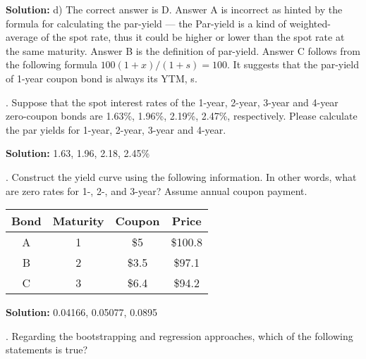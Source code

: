 \documentclass[11.5pt]{article}
\begin{document}
\noindent \textbf{Solution:} d) The correct answer is D. Answer A is incorrect as hinted by the formula for calculating the par-yield --- the Par-yield is a kind of weighted-average of the spot rate, thus it could be higher or lower than the spot rate at the same maturity. Answer B is the definition of par-yield. Answer C follows from the following formula $100(1+x)/(1+s)=100$. It suggests that the par-yield of 1-year coupon bond is always its YTM, s.


\vspace{30pt}



\newpage 



. Suppose that the spot interest rates of the 1-year, 2-year, 3-year and 4-year zero-coupon bonds are 1.63\%, 1.96\%, 2.19\%, 2.47\%, respectively. Please calculate the par yields for 1-year, 2-year, 3-year and 4-year.

\vskip1cm

\noindent \textbf{Solution:} 1.63, 1.96, 2.18, 2.45\%


\vspace{70pt}

. Construct the yield curve using the following information. In other words, what are zero rates for 1-, 2-, and 3-year? Assume annual coupon payment.

\begin{table}[h]
	\begin{tabular}{cccc}
		Bond & Maturity & Coupon & Price   \\ \hline
		A    & 1        & \$5    & \$100.8 \\
		B    & 2        & \$3.5  & \$97.1  \\
		C    & 3        & \$6.4  & \$94.2  \\ \hline
	\end{tabular}
\end{table}

\noindent \textbf{Solution:} 0.04166, 0.05077, 0.0895


\vspace{70pt}





. Regarding the bootstrapping and regression approaches, which of the following statements is true?
\end{document}
